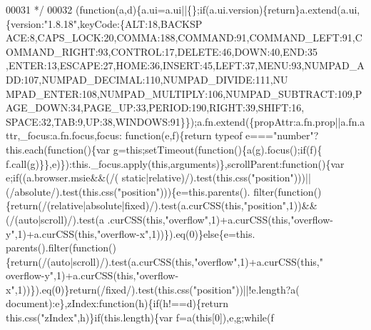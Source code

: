 \begin{DoxyCode}
00031  */
00032 (\textcolor{keyword}{function}(a,d)\{a.ui=a.ui||\{\};\textcolor{keywordflow}{if}(a.ui.version)\{return\}a.extend(a.ui,\{version:\textcolor{stringliteral}{"1.8.18"},keyCode:\{ALT:18,BACKSP
      ACE:8,CAPS\_LOCK:20,COMMA:188,COMMAND:91,COMMAND\_LEFT:91,COMMAND\_RIGHT:93,CONTROL:17,DELETE:46,DOWN:40,END:35
      ,ENTER:13,ESCAPE:27,HOME:36,INSERT:45,LEFT:37,MENU:93,NUMPAD\_ADD:107,NUMPAD\_DECIMAL:110,NUMPAD\_DIVIDE:111,NU
      MPAD\_ENTER:108,NUMPAD\_MULTIPLY:106,NUMPAD\_SUBTRACT:109,PAGE\_DOWN:34,PAGE\_UP:33,PERIOD:190,RIGHT:39,SHIFT:16,
      SPACE:32,TAB:9,UP:38,WINDOWS:91\}\});a.fn.extend(\{propAttr:a.fn.prop||a.fn.attr,\_focus:a.fn.focus,focus:\textcolor{keyword}{
      function}(e,f)\{\textcolor{keywordflow}{return} typeof e===\textcolor{stringliteral}{"number"}?this.each(\textcolor{keyword}{function}()\{var g=\textcolor{keyword}{this};setTimeout(\textcolor{keyword}{function}()\{a(g).focus();\textcolor{keywordflow}{if}(f)\{
      f.call(g)\}\},e)\}):this.\_focus.apply(\textcolor{keyword}{this},arguments)\},scrollParent:\textcolor{keyword}{function}()\{var e;\textcolor{keywordflow}{if}((a.browser.msie&&(/(\textcolor{keyword}{
      static}|relative)/).test(\textcolor{keyword}{this}.css(\textcolor{stringliteral}{"position"})))||(/absolute/).test(this.css(\textcolor{stringliteral}{"position"})))\{e=this.parents().
      filter(\textcolor{keyword}{function}()\{\textcolor{keywordflow}{return}(/(relative|absolute|fixed)/).test(a.curCSS(\textcolor{keyword}{this},\textcolor{stringliteral}{"position"},1))&&(/(\textcolor{keyword}{auto}|scroll)/).test(a
      .curCSS(\textcolor{keyword}{this},\textcolor{stringliteral}{"overflow"},1)+a.curCSS(\textcolor{keyword}{this},\textcolor{stringliteral}{"overflow-y"},1)+a.curCSS(\textcolor{keyword}{this},\textcolor{stringliteral}{"overflow-x"},1))\}).eq(0)\}\textcolor{keywordflow}{else}\{e=this.
      parents().filter(\textcolor{keyword}{function}()\{\textcolor{keywordflow}{return}(/(\textcolor{keyword}{auto}|scroll)/).test(a.curCSS(\textcolor{keyword}{this},\textcolor{stringliteral}{"overflow"},1)+a.curCSS(\textcolor{keyword}{this},\textcolor{stringliteral}{"
      overflow-y"},1)+a.curCSS(\textcolor{keyword}{this},\textcolor{stringliteral}{"overflow-x"},1))\}).eq(0)\}\textcolor{keywordflow}{return}(/fixed/).test(this.css(\textcolor{stringliteral}{"position"}))||!e.length?a(
      document):e\},zIndex:\textcolor{keyword}{function}(h)\{\textcolor{keywordflow}{if}(h!==d)\{\textcolor{keywordflow}{return} this.css(\textcolor{stringliteral}{"zIndex"},h)\}\textcolor{keywordflow}{if}(this.length)\{var f=a(\textcolor{keyword}{this}[0]),e,g;\textcolor{keywordflow}{while}(f

\end{DoxyCode}
